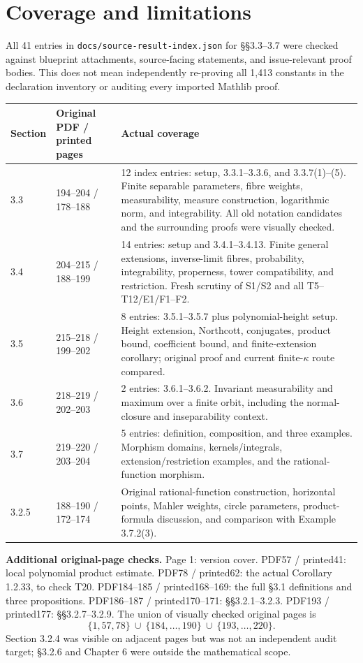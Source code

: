 \documentclass[11pt,a4paper]{article}
\newcommand{\code}[1]{{\small\nolinkurl{#1}}}
\begin{document}
\section{Coverage and limitations}
All 41 entries in \code{docs/source-result-index.json} for \S\S3.3--3.7 were checked against blueprint attachments, source-facing statements, and issue-relevant proof bodies. This does not mean independently re-proving all 1,413 constants in the declaration inventory or auditing every imported Mathlib proof.

\begin{longtable}{@{}p{25mm}p{36mm}p{\dimexpr\linewidth-61mm-4\tabcolsep\relax}@{}}
\toprule Section & Original PDF / printed pages & Actual coverage\\\midrule\endhead
3.3 & 194--204 / 178--188 &
12 index entries: setup, 3.3.1--3.3.6, and 3.3.7(1)--(5). Finite separable parameters, fibre weights, measurability, measure construction, logarithmic norm, and integrability. All old notation candidates and the surrounding proofs were visually checked.\\[4pt]
3.4 & 204--215 / 188--199 &
14 entries: setup and 3.4.1--3.4.13. Finite general extensions, inverse-limit fibres, probability, integrability, properness, tower compatibility, and restriction. Fresh scrutiny of S1/S2 and all T5--T12/E1/F1--F2.\\[4pt]
3.5 & 215--218 / 199--202 &
8 entries: 3.5.1--3.5.7 plus polynomial-height setup. Height extension, Northcott, conjugates, product bound, coefficient bound, and finite-extension corollary; original proof and current finite-$\kappa$ route compared.\\[4pt]
3.6 & 218--219 / 202--203 &
2 entries: 3.6.1--3.6.2. Invariant measurability and maximum over a finite orbit, including the normal-closure and inseparability context.\\[4pt]
3.7 & 219--220 / 203--204 &
5 entries: definition, composition, and three examples. Morphism domains, kernels/integrals, extension/restriction examples, and the rational-function morphism.\\[4pt]
3.2.5 & 188--190 / 172--174 &
Original rational-function construction, horizontal points, Mahler weights, circle parameters, product-formula discussion, and comparison with Example 3.7.2(3).\\\bottomrule
\end{longtable}

\noindent\textbf{Additional original-page checks.}
Page 1: version cover.
PDF57 / printed41: local polynomial product estimate.
PDF78 / printed62: the actual Corollary 1.2.33, to check T20.
PDF184--185 / printed168--169: the full \S3.1 definitions and three propositions.
PDF186--187 / printed170--171: \S\S3.2.1--3.2.3.
PDF193 / printed177: \S\S3.2.7--3.2.9.
The union of visually checked original pages is
\[
 \{1,57,78\}\ \cup\ \{184,\ldots,190\}\ \cup\ \{193,\ldots,220\}.
\]
Section 3.2.4 was visible on adjacent pages but was not an independent audit target; \S3.2.6 and Chapter 6 were outside the mathematical scope.
\end{document}
